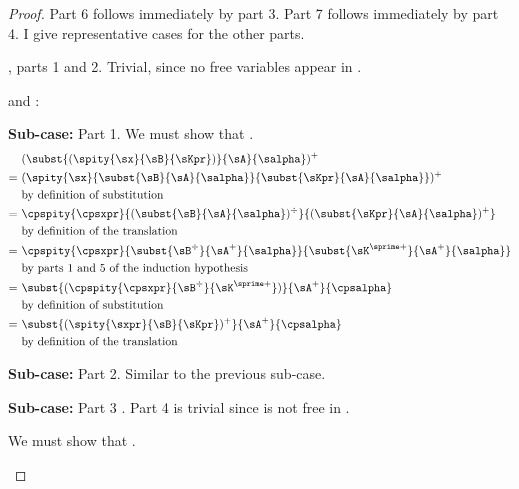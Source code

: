 {\begin{proof}
    Part 6 follows immediately by part 3.
    Part 7 follows immediately by part 4.
    I give representative cases for the other parts.
    \begin{proofcases}
    \item {}, parts 1 and 2. Trivial, since no free variables appear in \im{\sstarty}.
    \item {} and : \im{\st = \spity{\sx}{\sB}{\sKpr}}
    \item[{\bfseries Sub-case:}] Part 1. We must show that
      \im{(\subst{(\spity{\sx}{\sB}{\sKpr})}{\sA}{\salpha})^+ =
        \subst{(\spity{\sx}{\sB}{\sKpr})^+}{\sA^+}{\cpsalpha}}.
      \begin{align}
        & (\subst{(\spity{\sx}{\sB}{\sKpr})}{\sA}{\salpha})^+ \nonumber \\
        =~&(\spity{\sx}{\subst{\sB}{\sA}{\salpha}}{\subst{\sKpr}{\sA}{\salpha}})^+ \\
        & \text{by definition of substitution} \nonumber \\
        =~&\cpspity{\cpsxpr}{(\subst{\sB}{\sA}{\salpha})^\div}{(\subst{\sKpr}{\sA}{\salpha})^+} \\
        & \text{by definition of the translation} \nonumber \\
        =~&\cpspity{\cpsxpr}{\subst{\sB^\div}{\sA^+}{\salpha}}{\subst{\sK^{\sprime+}}{\sA^+}{\salpha}}\\
        & \text{by parts 1 and 5 of the induction hypothesis} \nonumber \\
        =~& \subst{(\cpspity{\cpsxpr}{\sB^\div}{\sK^{\sprime+}})}{\sA^+}{\cpsalpha} \\
        & \text{by definition of substitution} \nonumber \\
        =~&\subst{(\spity{\sxpr}{\sB}{\sKpr})^+}{\sA^+}{\cpsalpha} \\
        & \text{by definition of the translation} \nonumber
      \end{align}
    \item[{\bfseries Sub-case:}] Part 2. Similar to the previous sub-case.

    \item {}
      \item[{\bfseries Sub-case:}] Part 3 \im{\st = \salphapr}. Part 4 is trivial since \im{\sx} is not free in
        \im{\salpha}.

        We must show that \im{(\subst{\salphapr}{\sA}{\salpha})^+ = \subst{\cpsalphapr}{\sA^+}{\cpsalpha}}.


\end{proofcases}
\end{proof}}
